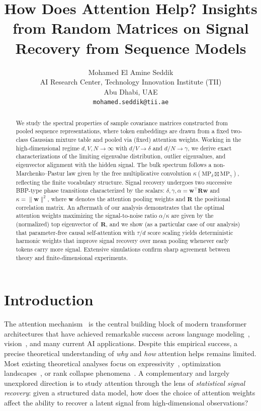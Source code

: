 \documentclass{article}
\title{How Does Attention Help? Insights from Random Matrices on Signal Recovery from Sequence Models}
\author{%
  Mohamed El Amine Seddik \\
  AI Research Center, Technology Innovation Institute (TII) \\
  Abu Dhabi, UAE \\
  \texttt{mohamed.seddik@tii.ae} \\
}
\def\vw{{\bm{w}}}
\def\mR{{\bm{R}}}
\begin{document}
\maketitle

\begin{abstract}
We study the spectral properties of sample covariance matrices constructed from pooled sequence representations, where token embeddings are drawn from a fixed two-class Gaussian mixture table and pooled via (fixed) attention weights. Working in the high-dimensional regime $d,V,N\to\infty$ with $d/V\to\delta$ and $d/N\to\gamma$, we derive exact characterizations of the limiting eigenvalue distribution, outlier eigenvalues, and eigenvector alignment with the hidden signal. The bulk spectrum follows a non-Marchenko--Pastur law given by the free multiplicative convolution $\kappa(\mathrm{MP}_\delta\boxtimes\mathrm{MP}_\gamma)$, reflecting the finite vocabulary structure. Signal recovery undergoes two successive BBP-type phase transitions characterized by the scalars: $\delta,\gamma,\alpha=\vw^\top\mR\vw$ and $\kappa=\|\vw\|^2$, where $\vw$ denotes the attention pooling weights and $\mR$ the positional correlation matrix. An aftermath of our analysis demonstrates that the optimal attention weights maximizing the signal-to-noise ratio $\alpha/\kappa$ are given by the (normalized) top eigenvector of~$\mR$, and we show (as a particular case of our analysis) that parameter-free causal self-attention with $\tau/d$ score scaling yields deterministic harmonic weights that improve signal recovery over mean pooling whenever early tokens carry more signal. Extensive simulations confirm sharp agreement between theory and finite-dimensional experiments.
\end{abstract}


\section{Introduction}\label{sec:intro}

The attention mechanism~\citep{vaswani2017attention} is the central building block of modern transformer architectures that have achieved remarkable success across language modeling~\citep{devlin2019bert,brown2020language}, vision~\citep{dosovitskiy2020image}, and many current AI applications. Despite this empirical success, a precise theoretical understanding of \emph{why} and \emph{how} attention helps remains limited. Most existing theoretical analyses focus on expressivity~\citep{yun2019transformers}, optimization landscapes~\citep{sahiner2022unraveling}, or rank collapse phenomena~\citep{dong2021attention}. A complementary and largely unexplored direction is to study attention through the lens of \emph{statistical signal recovery}: given a structured data model, how does the choice of attention weights affect the ability to recover a latent signal from high-dimensional observations?
\end{document}

